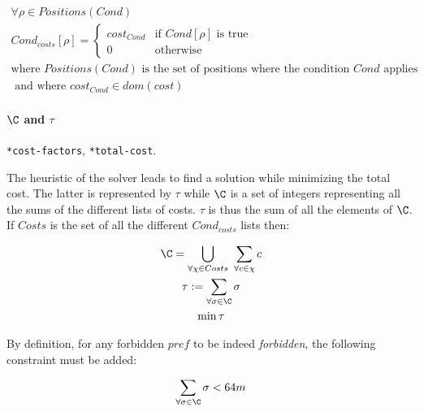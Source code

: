 \begin{equation}
    \begin{gathered}
        \forall \rho \in Positions(Cond)\\
        Cond_{costs}[\rho] = \begin{cases}
            cost_{Cond} & \text{if } Cond[\rho] \text{ is true}\\
            0 & \text{otherwise}
        \end{cases}\\
        \text{where } Positions(Cond) \text{ is the set of positions where the condition } Cond \text{ applies}\\
        \text{ and where } cost_{Cond} \in dom(cost)
    \end{gathered}
\end{equation}

\paragraph{$\C$ and $\tau$} \texttt{*cost-factors}, \texttt{*total-cost}.

The heuristic of the solver leads to find a solution while minimizing the total cost. The latter is represented by $\tau$ while $\C$ is a set of integers representing all the sums of the different lists of costs. $\tau$ is thus the sum of all the elements of $\C$. If $Costs$ is the set of all the different $Cond_{costs}$ lists then:

\begin{equation}
    \begin{gathered}
        \C = \bigcup _{\forall \chi \in Costs} \ \sum _{\forall c \in \chi} c\\
        \tau := \sum _{\forall \sigma \in \C} \sigma\\
        \min \tau
    \end{gathered}
\end{equation}

By definition, for any forbidden $pref$ to be indeed \emph{forbidden}, the following constraint must be added:

\begin{equation}
    \begin{gathered}
        \sum _{\forall \sigma \in \C} \sigma < 64m
    \end{gathered}
\end{equation}




